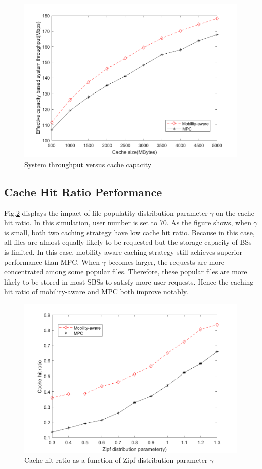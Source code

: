 \documentclass[conference]{IEEEtran}
\begin{document}
\begin{figure}[htbp]
 \centerline{\includegraphics[scale=0.3]{fig4.png}}
 \caption{System throughput versus cache capacity}
 \label{fig 4}
\end{figure}
\subsection{Cache Hit Ratio Performance}
Fig.\ref{fig 5} displays the impact of file populatity distribution parameter $\gamma$ on the cache hit ratio. In this simulation, user number is set to 70. As the figure shows, when $\gamma$ is small, both two caching strategy have low cache hit ratio. Because in this case, all files are almost equally likely to be requested but the storage capacity of BSs is limited. In this case, mobility-aware caching strategy still achieves superior performance than MPC. When $\gamma$ becomes larger, the requests are more concentrated among some popular files. Therefore, these popular files are more likely to be stored in most SBSs to satisfy more user requests. Hence the caching hit ratio of mobility-aware and MPC both improve notably.
\begin{figure}[htbp]
 \centerline{\includegraphics[scale=0.3]{fig5.png}}
 \caption{Cache hit ratio as a function of Zipf distribution parameter $\gamma$ }
 \label{fig 5}
\end{figure}
\end{document}
